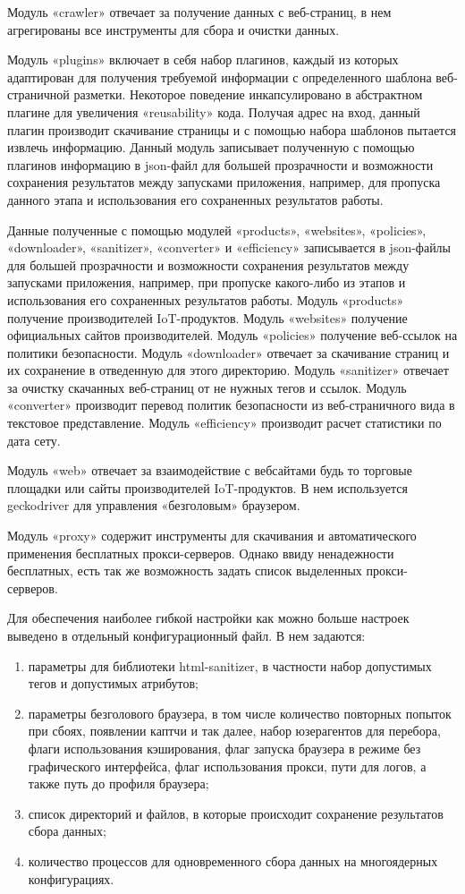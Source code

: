 \documentclass[../main]{subfiles}
\begin{document}
Модуль «crawler» отвечает за получение данных с веб-страниц, в нем агрегированы все инструменты для сбора и очистки данных. 

Модуль «plugins» включает в себя набор плагинов, каждый из которых адаптирован для получения требуемой информации с определенного шаблона веб-страничной разметки. Некоторое поведение инкапсулировано в абстрактном плагине для увеличения «reusability» кода. Получая адрес на вход, данный плагин производит скачивание страницы и с помощью набора шаблонов пытается извлечь информацию. Данный модуль записывает полученную с помощью плагинов информацию в json-файл для большей прозрачности и возможности сохранения результатов между запусками приложения, например, для пропуска данного этапа и использования его сохраненных результатов работы. 

Данные полученные с помощью модулей «products», «websites», «policies», «downloader», «sanitizer», «converter» и «efficiency» записывается в json-файлы для большей прозрачности и возможности сохранения результатов между запусками приложения, например, при пропуске какого-либо из этапов и использования его сохраненных результатов работы. Модуль «products» получение производителей IoT-продуктов. Модуль «websites» получение официальных сайтов производителей. Модуль «policies» получение веб-ссылок на политики безопасности. Модуль «downloader» отвечает за скачивание страниц и их сохранение в отведенную для этого директорию. Модуль «sanitizer» отвечает за очистку скачанных веб-страниц от не нужных тегов и ссылок. Модуль «converter» производит перевод политик безопасности из веб-страничного вида в текстовое представление. Модуль «efficiency» производит расчет статистики по дата сету.

Модуль «web» отвечает за взаимодействие с вебсайтами будь то торговые площадки или сайты производителей IoT-продуктов. В нем используется geckodriver для управления «безголовым» браузером. 

Модуль «proxy» содержит инструменты для скачивания и автоматического применения бесплатных прокси-серверов. Однако ввиду ненадежности бесплатных, есть так же возможность задать список выделенных прокси-серверов. 

Для обеспечения наиболее гибкой настройки как можно больше настроек выведено в отдельный конфигурационный файл. В нем задаются:

\begin{enumerate}
    \item параметры для библиотеки html-sanitizer, в частности набор допустимых тегов и допустимых атрибутов;
    \item параметры безголового браузера, в том числе количество повторных попыток при сбоях, появлении каптчи и так далее, набор юзерагентов для перебора, флаги использования кэширования, флаг запуска браузера в режиме без графического интерфейса, флаг использования прокси, пути для логов, а также путь до профиля браузера;
    \item список директорий и файлов, в которые происходит сохранение результатов сбора данных;
    \item количество процессов для одновременного сбора данных на многоядерных конфигурациях.
\end{enumerate}
\end{document}
